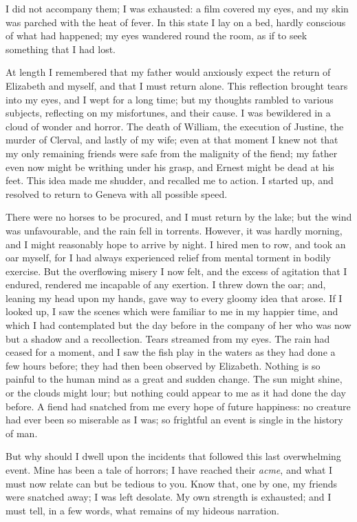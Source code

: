I did not accompany them; I was
exhausted: a film covered my eyes,
and my skin was parched with the heat
of fever. In this state I lay on a bed,
hardly conscious of what had happened;
my eyes wandered round the
room, as if to seek something that I
had lost.

At length I remembered that my father
would anxiously expect the return
of Elizabeth and myself, and that I
must return alone. This reflection
brought tears into my eyes, and I wept
for a long time; but my thoughts rambled
to various subjects, reflecting on
my misfortunes, and their cause. I
was bewildered in a cloud of wonder
and horror. The death of William,
the execution of Justine, the murder
of Clerval, and lastly of my wife; even
at that moment I knew not that my
only remaining friends were safe from
the malignity of the fiend; my father
even now might be writhing under his
grasp, and Ernest might be dead at his
feet. This idea made me shudder, and
recalled me to action. I started up,
and resolved to return to Geneva with
all possible speed.

There were no horses to be procured,
and I must return by the lake;
but the wind was unfavourable, and
the rain fell in torrents. However, it
was hardly morning, and I might reasonably
hope to arrive by night. I
hired men to row, and took an oar
myself, for I had always experienced
relief from mental torment in bodily
exercise. But the overflowing misery
I now felt, and the excess of agitation
that I endured, rendered me incapable
of any exertion. I threw down the oar;
and, leaning my head upon my hands,
gave way to every gloomy idea that
arose. If I looked up, I saw the scenes
which were familiar to me in my happier
time, and which I had contemplated
but the day before in the company
of her who was now but a shadow
and a recollection. Tears streamed
from my eyes. The rain had ceased for
a moment, and I saw the fish play in
the waters as they had done a few hours
before; they had then been observed
by Elizabeth. Nothing is so painful
to the human mind as a great and sudden
change. The sun might shine, or
the clouds might lour; but nothing
could appear to me as it had done the
day before. A fiend had snatched from
me every hope of future happiness: no
creature had ever been so miserable as
I was; so frightful an event is single
in the history of man.

But why should I dwell upon the incidents
that followed this last overwhelming
event. Mine has been a
tale of horrors; I have reached their
\emph{acme}, and what I must now relate can
but be tedious to you. Know that,
one by one, my friends were snatched
away; I was left desolate. My own
strength is exhausted; and I must tell,
in a few words, what remains of my
hideous narration.

